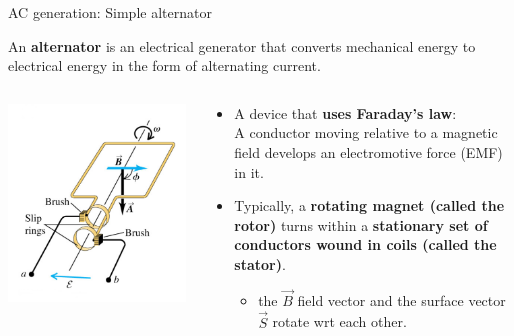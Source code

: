 %
%
%

\begin{frame}{AC generation: Simple alternator}

An {\bf alternator} is an electrical generator that converts mechanical energy to
electrical energy in the form of alternating current.

\begin{columns}
  \begin{column}{0.45\textwidth}
    \begin{center}
       \includegraphics[width=0.98\textwidth]{./images/schematics/simple_alternator.png}\\
     \end{center}
  \end{column}
  \begin{column}{0.55\textwidth}
     \begin{itemize}
        \item A device that {\bf uses Faraday's law}:\\
                  A conductor moving relative to a magnetic field
                  develops an electromotive force (EMF) in it.
        \vspace{0.2cm}
        \item Typically, a {\bf rotating magnet (called the rotor)} turns within a {\bf stationary set of
                  conductors wound in coils (called the stator)}.
          \begin{itemize}
               \item the $\vec{B}$ field vector and the surface vector $\vec{S}$ rotate wrt each other.
         \end{itemize}
     \end{itemize}
  \end{column}
\end{columns}

\end{frame}

